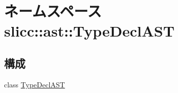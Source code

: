 \hypertarget{namespaceslicc_1_1ast_1_1TypeDeclAST}{
\section{ネームスペース slicc::ast::TypeDeclAST}
\label{namespaceslicc_1_1ast_1_1TypeDeclAST}
}
\subsection*{構成}
\begin{DoxyCompactItemize}
\item 
class \hyperlink{classslicc_1_1ast_1_1TypeDeclAST_1_1TypeDeclAST}{TypeDeclAST}
\end{DoxyCompactItemize}
